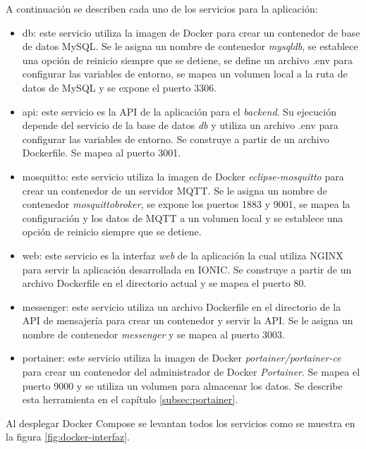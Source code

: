A continuación se describen cada uno de los servicios para la aplicación:

\begin{itemize}

\item db: este servicio utiliza la imagen de Docker para crear un contenedor de base de datos MySQL. Se le asigna un nombre de contenedor \textit{mysqldb}, se establece una opción de reinicio siempre que se detiene, se define un archivo .env para configurar las variables de entorno, se mapea un volumen local a la ruta de datos de MySQL y se expone el puerto 3306.

\item api: este servicio es la API de la aplicación para el \textit{backend}. Su ejecución depende del servicio de la base de datos \textit{db} y utiliza un archivo .env para configurar las variables de entorno. Se construye a partir de un archivo Dockerfile. Se mapea al puerto 3001.

\item mosquitto: este servicio utiliza la imagen de Docker \textit{eclipse-mosquitto} para crear un contenedor de un servidor MQTT. Se le asigna un nombre de contenedor \textit{mosquittobroker}, se expone los puertos 1883 y 9001, se mapea la configuración y los datos de MQTT a un volumen local y se establece una opción de reinicio siempre que se detiene.

\item web: este servicio es la interfaz \textit{web} de la aplicación la cual utiliza NGINX para servir la aplicación desarrollada en IONIC. Se construye a partir de un archivo Dockerfile en el directorio actual y se mapea el puerto 80.

\item messenger: este servicio utiliza un archivo Dockerfile en el directorio de la API de mensajería para crear un contenedor y servir la API. Se le asigna un nombre de contenedor \textit{messenger} y se mapea al puerto 3003.

\item portainer: este servicio utiliza la imagen de Docker \textit{portainer/portainer-ce} para crear un contenedor del administrador de Docker \textit{Portainer}. Se mapea el puerto 9000 y se utiliza un volumen para almacenar los datos. Se describe esta herramienta en el capítulo \ref{subsec:portainer}.
\end{itemize}

Al desplegar Docker Compose se levantan todos los servicios como se muestra en la figura \ref{fig:docker-interfaz}.

